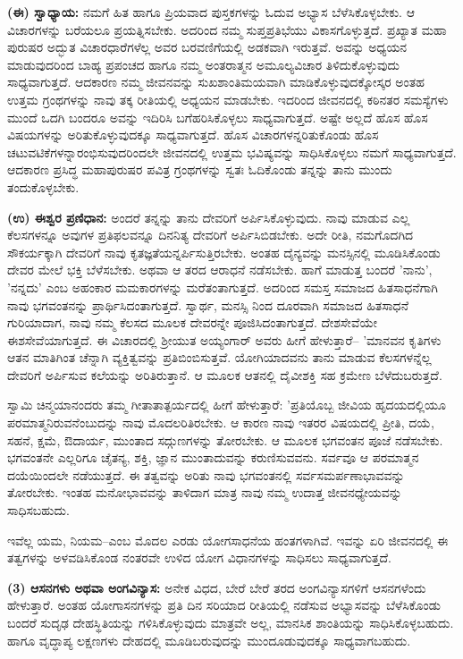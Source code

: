 \textbf{(ಈ) ಸ್ವಾಧ್ಯಾಯ:} ನಮಗೆ ಹಿತ ಹಾಗೂ ಪ್ರಿಯವಾದ ಪುಸ್ತಕಗಳನ್ನು ಓದುವ ಅಭ್ಯಾಸ ಬೆಳೆಸಿಕೊಳ್ಳಬೇಕು. ಆ ವಿಚಾರಗಳನ್ನು ಬರೆಯಲೂ ಪ್ರಯತ್ನಿಸಬೇಕು. ಅದರಿಂದ ನಮ್ಮ ಸುಪ್ತಪ್ರತಿಭೆಯು ವಿಕಾಸಗೊಳ್ಳುತ್ತದೆ. ಪ್ರಖ್ಯಾತ ಮಹಾ ಪುರುಷರ ಅದ್ಭುತ ವಿಚಾರಧಾರೆಗಳೆಲ್ಲ ಅವರ ಬರವಣಿಗೆಯಲ್ಲಿ ಅಡಕವಾಗಿ ಇರುತ್ತವೆ. ಅವನ್ನು ಅಧ್ಯಯನ ಮಾಡುವುದರಿಂದ ಬಾಹ್ಯ ಪ್ರಪಂಚದ ಹಾಗೂ ನಮ್ಮ ಅಂತರಾತ್ಮನ ಅಮೂಲ್ಯವಿಚಾರ ತಿಳಿದುಕೊಳ್ಳುವುದು ಸಾಧ್ಯವಾಗುತ್ತದೆ. ಆದಕಾರಣ ನಮ್ಮ ಜೀವನವನ್ನು ಸುಖಶಾಂತಿಮಯವಾಗಿ ಮಾಡಿಕೊಳ್ಳುವುದಕ್ಕೋಸ್ಕರ ಅಂತಹ ಉತ್ತಮ ಗ್ರಂಥಗಳನ್ನು ನಾವು ತಕ್ಕ ರೀತಿಯಲ್ಲಿ ಅಧ್ಯಯನ ಮಾಡಬೇಕು. ಇದರಿಂದ ಜೀವನದಲ್ಲಿ ಕಠಿನತರ ಸಮಸ್ಯೆಗಳು ಮುಂದೆ ಒದಗಿ ಬಂದರೂ ಅವನ್ನು ಇದಿರಿಸಿ ಬಗೆಹರಿಸಿಕೊಳ್ಳಲು ಸಾಧ್ಯವಾಗುತ್ತದೆ. ಅಷ್ಟೇ ಅಲ್ಲದೆ ಹೊಸ ಹೊಸ ವಿಷಯಗಳನ್ನು ಅರಿತುಕೊಳ್ಳುವುದಕ್ಕೂ ಸಾಧ್ಯವಾಗುತ್ತದೆ. ಹೊಸ ವಿಚಾರಗಳನ್ನರಿತುಕೊಂಡು ಹೊಸ ಚಟುವಟಿಕೆಗಳನ್ನಾರಂಭಿಸುವುದರಿಂದಲೇ ಜೀವನದಲ್ಲಿ ಉತ್ತಮ ಭವಿಷ್ಯವನ್ನು ಸಾಧಿಸಿಕೊಳ್ಳಲು ನಮಗೆ ಸಾಧ್ಯವಾಗುತ್ತದೆ. ಆದಕಾರಣ ಪ್ರಸಿದ್ಧ ಮಹಾಪುರುಷರ ಪವಿತ್ರ ಗ್ರಂಥಗಳನ್ನು ಸ್ವತಃ ಓದಿಕೊಂಡು ತನ್ನನ್ನು ತಾನು ಮುಂದು ತಂದುಕೊಳ್ಳಬೇಕು.

\textbf{(ಉ) ಈಶ್ವರ ಪ್ರಣಿಧಾನ:} ಅಂದರೆ ತನ್ನನ್ನು ತಾನು ದೇವರಿಗೆ ಅರ್ಪಿಸಿಕೊಳ್ಳುವುದು. ನಾವು ಮಾಡುವ ಎಲ್ಲ ಕೆಲಸಗಳನ್ನೂ ಅವುಗಳ ಪ್ರತಿಫಲವನ್ನೂ ದಿನನಿತ್ಯ ದೇವರಿಗೆ ಅರ್ಪಿಸಿಬಿಡಬೇಕು. ಅದೇ ರೀತಿ, ನಮಗೊದಗಿದ ಸೌಕರ್ಯಕ್ಕಾಗಿ ದೇವರಿಗೆ ನಾವು ಕೃತಜ್ಞತೆಯನ್ನರ್ಪಿಸುತ್ತಿರಬೇಕು. ಅಂತಹ ದೈನ್ಯವನ್ನು ಮನಸ್ಸಿನಲ್ಲಿ ಮೂಡಿಸಿಕೊಂಡು ದೇವರ ಮೇಲೆ ಭಕ್ತಿ ಬೆಳೆಸಬೇಕು. ಅಥವಾ ಆ ತರದ ಆರಾಧನೆ ನಡೆಸಬೇಕು. ಹಾಗೆ ಮಾಡುತ್ತ ಬಂದರೆ 'ನಾನು', 'ನನ್ನದು' ಎಂಬ ಅಹಂಕಾರ ಮಮಕಾರಗಳನ್ನು ಮರೆತಂತಾಗುತ್ತದೆ. ಅದರಿಂದ ಸಮಸ್ತ ಸಮಾಜದ ಹಿತಸಾಧನೆಗಾಗಿ ನಾವು ಭಗವಂತನನ್ನು ಪ್ರಾರ್ಥಿಸಿದಂತಾಗುತ್ತದೆ. ಸ್ವಾರ್ಥ, ಮನಸ್ಸಿ ನಿಂದ ದೂರವಾಗಿ ಸಮಾಜದ ಹಿತಸಾಧನೆ ಗುರಿಯಾದಾಗ, ನಾವು ನಮ್ಮ ಕೆಲಸದ ಮೂಲಕ ದೇವರನ್ನೇ ಪೂಜಿಸಿದಂತಾಗುತ್ತದೆ. ದೇಶಸೇವೆಯೇ ಈಶಸೇವೆಯಾಗುತ್ತದೆ. ಈ ವಿಚಾರದಲ್ಲಿ ಶ‍್ರೀಯುತ ಅಯ್ಯಂಗಾರ್ ಅವರು ಹೀಗೆ ಹೇಳುತ್ತಾರೆ– 'ಮಾನವನ ಕೃತಿಗಳು ಆತನ ಮಾತಿಗಿಂತ ಚೆನ್ನಾಗಿ ವ್ಯಕ್ತಿತ್ವವನ್ನು ಪ್ರತಿಬಿಂಬಿಸುತ್ತವೆ. ಯೋಗಿಯಾದವನು ತಾನು ಮಾಡುವ ಕೆಲಸಗಳನ್ನೆಲ್ಲ ದೇವರಿಗೆ ಅರ್ಪಿಸುವ ಕಲೆಯನ್ನು ಅರಿತಿರುತ್ತಾನೆ. ಆ ಮೂಲಕ ಆತನಲ್ಲಿ ದೈವೀಶಕ್ತಿ ಸಹ ಕ್ರಮೇಣ ಬೆಳೆದುಬರುತ್ತದೆ.

ಸ್ವಾಮಿ ಚಿನ್ಮಯಾನಂದರು ತಮ್ಮ ಗೀತಾತಾತ್ಪರ್ಯದಲ್ಲಿ ಹೀಗೆ ಹೇಳುತ್ತಾರೆ: 'ಪ್ರತಿಯೊಬ್ಬ ಜೀವಿಯ ಹೃದಯದಲ್ಲಿಯೂ ಪರಮಾತ್ಮನಿರುವನೆಂಬುದನ್ನು ನಾವು ಮೊದಲರಿತಿರಬೇಕು. ಆ ಕಾರಣ ನಾವು ಇತರರ ವಿಷಯದಲ್ಲಿ ಪ್ರೀತಿ, ದಯೆ, ಸಹನೆ, ಕ್ಷಮೆ, ಔದಾರ್ಯ, ಮುಂತಾದ ಸದ್ಗುಣಗಳನ್ನು ತೋರಬೇಕು. ಆ ಮೂಲಕ ಭಗವಂತನ ಪೂಜೆ ನಡೆಸಬೇಕು. ಭಗವಂತನೇ ಎಲ್ಲರಿಗೂ ಚೈತನ್ಯ, ಶಕ್ತಿ, ಜ್ಞಾನ ಮುಂತಾದುವನ್ನು ಕರುಣಿಸುವವನು. ಸರ್ವವೂ ಆ ಪರಮಾತ್ಮನ ದಯೆಯಿಂದಲೇ ನಡೆಯುತ್ತದೆ. ಈ ತತ್ವವನ್ನು ಅರಿತು ನಾವು ಭಗವಂತನಲ್ಲಿ ಸರ್ವಸಮರ್ಪಣಾಭಾವವನ್ನು ತೋರಬೇಕು. ಇಂತಹ ಮನೋಭಾವವನ್ನು ತಾಳಿದಾಗ ಮಾತ್ರ ನಾವು ನಮ್ಮ ಉದಾತ್ತ ಜೀವನಧ್ಯೇಯವನ್ನು ಸಾಧಿಸಬಹುದು.

ಇವೆಲ್ಲ ಯಮ, ನಿಯಮ–ಎಂಬ ಮೊದಲ ಎರಡು ಯೋಗಸಾಧನೆಯ ಹಂತಗಳಾಗಿವೆ. ಇವನ್ನು ಏರಿ ಜೀವನದಲ್ಲಿ ಈ ತತ್ವಗಳನ್ನು ಅಳವಡಿಸಿಕೊಂಡ ನಂತರವೇ ಉಳಿದ ಯೋಗ ವಿಧಾನಗಳನ್ನು ಸಾಧಿಸಲು ಸಾಧ್ಯವಾಗುತ್ತದೆ.

\textbf{(3) ಆಸನಗಳು ಅಥವಾ ಅಂಗವಿನ್ಯಾಸ:} ಅನೇಕ ವಿಧದ, ಬೇರೆ ಬೇರೆ ತರದ ಅಂಗವಿನ್ಯಾಸಗಳಿಗೆ ಆಸನಗಳೆಂದು ಹೇಳುತ್ತಾರೆ. ಅಂತಹ ಯೋಗಾಸನಗಳನ್ನು ಪ್ರತಿ ದಿನ ಸರಿಯಾದ ರೀತಿಯಲ್ಲಿ ನಡೆಸುವ ಅಭ್ಯಾಸವನ್ನು ಬೆಳೆಸಿಕೊಂಡು ಬಂದರೆ ಸುದೃಢ ದೇಹಸ್ಥಿತಿಯನ್ನು ಗಳಿಸಿಕೊಳ್ಳುವುದು ಮಾತ್ರವೇ ಅಲ್ಲ, ಮಾನಸಿಕ ಶಾಂತಿಯನ್ನು ಸಾಧಿಸಿಕೊಳ್ಳಬಹುದು. ಹಾಗೂ ವೃದ್ಧಾಪ್ಯ ಲಕ್ಷಣಗಳು ದೇಹದಲ್ಲಿ ಮೂಡಿಬರುವುದನ್ನು ಮುಂದೂಡುವುದಕ್ಕೂ ಸಾಧ್ಯವಾಗಬಹುದು.

